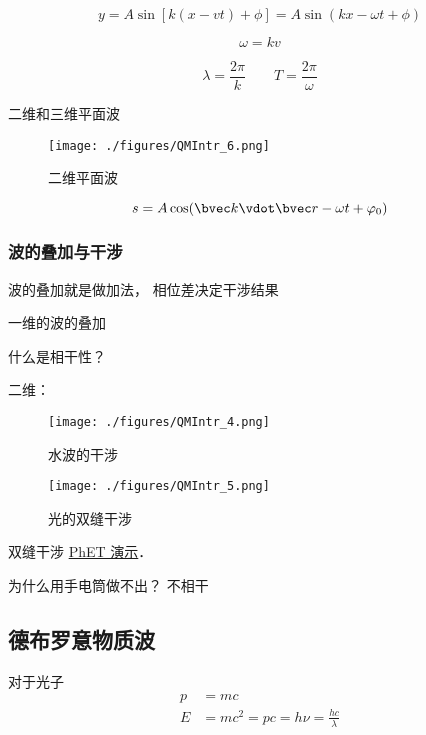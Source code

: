 \begin{equation}
y = A \sin[k(x-vt) + \phi] = A \sin(kx - \omega t + \phi)
\end{equation}

\begin{equation}
\omega = kv
\end{equation}

\begin{equation}
\lambda = \frac{2\pi}{k}
\qquad
T = \frac{2\pi}{\omega}
\end{equation}

二维和三维平面波

\begin{figure}[ht]
\centering
\texttt{[image: ./figures/QMIntr\_6.png]}
\caption{二维平面波} \label{QMIntr_fig6}
\end{figure}

\begin{equation}
s = A \cos(\bvec k \vdot \bvec r - \omega t + \varphi_0)
\end{equation}


\subsubsection{波的叠加与干涉}

波的叠加就是做加法， 相位差决定干涉结果

一维的波的叠加

什么是相干性？

二维：

\begin{figure}[ht]
\centering
\texttt{[image: ./figures/QMIntr\_4.png]}
\caption{水波的干涉} \label{QMIntr_fig4}
\end{figure}

\begin{figure}[ht]
\centering
\texttt{[image: ./figures/QMIntr\_5.png]}
\caption{光的双缝干涉} \label{QMIntr_fig5}
\end{figure}

双缝干涉 \href{https://phet.colorado.edu/sims/html/wave-interference/latest/wave-interference_en.html}{PhET 演示}．

为什么用手电筒做不出？ 不相干

\subsection{德布罗意物质波}

对于光子
\begin{equation}
\begin{aligned}
p &= mc
\\
E &= mc^2 = pc = h\nu = \frac{hc}{\lambda}
\end{aligned}
\end{equation}

